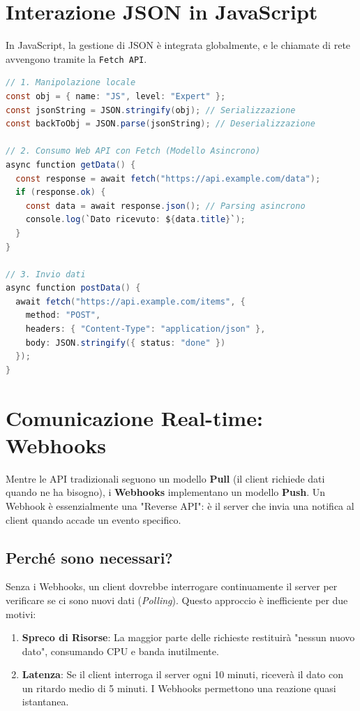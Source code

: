 \documentclass[11pt,a4paper]{report}
\begin{document}
\section{Interazione JSON in JavaScript}
In JavaScript, la gestione di JSON è integrata globalmente, e le chiamate di rete avvengono tramite la \texttt{Fetch API}.

\begin{lstlisting}[language=Java, caption=Gestione JSON e API in JavaScript]
// 1. Manipolazione locale
const obj = { name: "JS", level: "Expert" };
const jsonString = JSON.stringify(obj); // Serializzazione
const backToObj = JSON.parse(jsonString); // Deserializzazione

// 2. Consumo Web API con Fetch (Modello Asincrono)
async function getData() {
  const response = await fetch("https://api.example.com/data");
  if (response.ok) {
    const data = await response.json(); // Parsing asincrono
    console.log(`Dato ricevuto: ${data.title}`);
  }
}

// 3. Invio dati
async function postData() {
  await fetch("https://api.example.com/items", {
    method: "POST",
    headers: { "Content-Type": "application/json" },
    body: JSON.stringify({ status: "done" })
  });
}
\end{lstlisting}

\section{Comunicazione Real-time: Webhooks}
Mentre le API tradizionali seguono un modello \textbf{Pull} (il client richiede dati quando ne ha bisogno), i \textbf{Webhooks} implementano un modello \textbf{Push}. Un Webhook è essenzialmente una "Reverse API": è il server che invia una notifica al client quando accade un evento specifico.

\subsection{Perch\'e sono necessari?}
Senza i Webhooks, un client dovrebbe interrogare continuamente il server per verificare se ci sono nuovi dati (\textit{Polling}). Questo approccio è inefficiente per due motivi:
\begin{enumerate}
    \item \textbf{Spreco di Risorse}: La maggior parte delle richieste restituirà "nessun nuovo dato", consumando CPU e banda inutilmente.
    \item \textbf{Latenza}: Se il client interroga il server ogni 10 minuti, riceverà il dato con un ritardo medio di 5 minuti. I Webhooks permettono una reazione quasi istantanea.
\end{enumerate}
\end{document}
